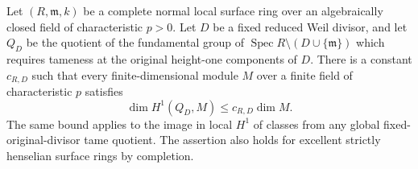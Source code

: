\begin{theorem}
\label{D:local-tame-p-linear-H1}
Let $(R,\mathfrak m,k)$ be a complete normal local surface ring over an
algebraically closed field of characteristic $p>0$. Let $D$ be a fixed
reduced Weil divisor, and let $Q_D$ be the quotient of the fundamental
group of $\operatorname{Spec}R\setminus(D\cup\{\mathfrak m\})$
which requires tameness at the original height-one components of $D$.
There is a constant $c_{R,D}$ such that every finite-dimensional module
$M$ over a finite field of characteristic $p$ satisfies
\[
 \dim H^1(Q_D,M)\le c_{R,D}\dim M.
\]
The same bound applies to the image in local $H^1$ of classes from any
global fixed-original-divisor tame quotient. The assertion also holds
for excellent strictly henselian surface rings by completion.
\end{theorem}
